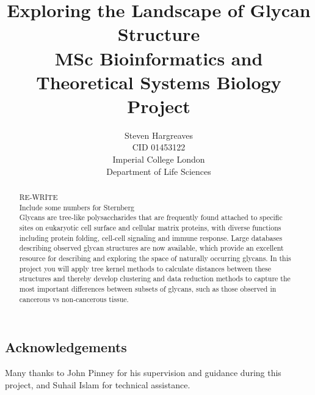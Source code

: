 \documentclass[12pt,a4paper]{article}
\begin{document}
{\selectfont}
\title{\Huge Exploring the Landscape of Glycan Structure\vspace{1cm}\\ \large  MSc Bioinformatics and Theoretical Systems Biology Project\vspace{11cm}}
\date{}

\author{\Large Steven Hargreaves\\
\normalsize CID 01453122 \\\vspace{0.5cm}
\normalsize Imperial College London \\
\normalsize Department of Life Sciences}


\maketitle
\newpage
\begin{abstract}
\doublespacing
\noindent RE-WRITE\\
Include some numbers for Sternberg\\
Glycans are tree-like polysaccharides that are frequently found attached to specific sites on eukaryotic cell surface and cellular matrix proteins, with diverse functions including protein folding, cell-cell signaling and immune response. Large databases describing observed glycan structures are now available, which provide an excellent resource for describing and exploring the space of naturally occurring glycans. In this project you will apply tree kernel methods to calculate distances between these structures and thereby develop clustering and data reduction methods to capture the most important differences between subsets of glycans, such as those observed in cancerous vs non-cancerous tissue.
\end{abstract}

\newpage
\begin{center}
\section*{Acknowledgements}
\doublespacing
Many thanks to John Pinney for his supervision and guidance during this project, and Suhail Islam for technical assistance.
\end{center}
\newpage
\tableofcontents
\newpage
\end{document}
